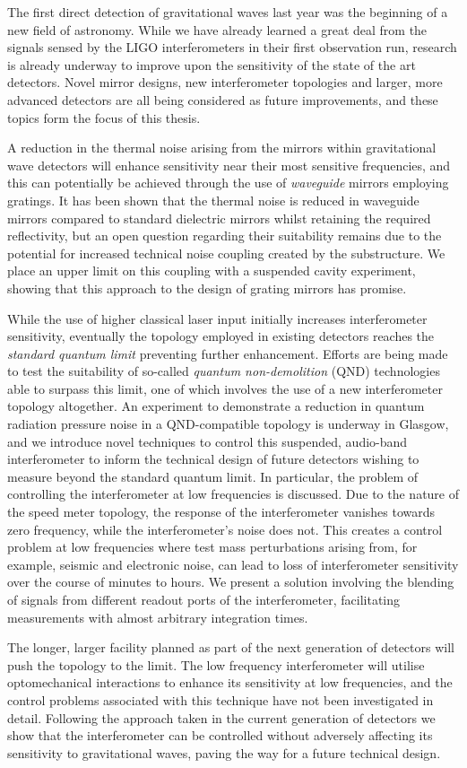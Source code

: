 The first direct detection of gravitational waves last year was the beginning 
of a new field of astronomy. While we have already learned a great deal from 
the signals sensed by the LIGO interferometers in their first observation run, 
research is already underway to improve upon the sensitivity of the state of the 
art detectors. Novel mirror designs, new interferometer topologies and larger, 
more advanced detectors are all being considered as future improvements, and 
these topics form the focus of this thesis.

A reduction in the thermal noise arising from the mirrors within gravitational 
wave detectors will enhance sensitivity near their most sensitive frequencies, 
and this can potentially be achieved through the use of \emph{waveguide} mirrors 
employing gratings. It has been shown that the thermal noise is reduced in 
waveguide mirrors compared to standard dielectric mirrors whilst retaining the 
required reflectivity, but an open question regarding their suitability remains 
due to the potential for increased technical noise coupling created by the 
substructure. We place an upper limit on this coupling with a suspended cavity 
experiment, showing that this approach to the design of grating mirrors has 
promise.

While the use of higher classical laser input initially increases 
interferometer sensitivity, eventually the \MI{} topology employed in existing 
detectors reaches the \emph{standard quantum limit} preventing further 
enhancement. Efforts are being made to test the suitability of so-called 
\emph{quantum non-demolition} (QND) technologies able to surpass this limit, one 
of which involves the use of a new interferometer topology altogether. An 
experiment to demonstrate a reduction in quantum radiation pressure noise in a 
QND-compatible \SSM{} topology is underway in Glasgow, and we introduce novel 
techniques to control this suspended, audio-band interferometer to inform the 
technical design of future detectors wishing to measure beyond the standard 
quantum limit. In particular, the problem of controlling the interferometer at 
low frequencies is discussed. Due to the nature of the speed meter topology, the 
response of the interferometer vanishes towards zero frequency, while the 
interferometer's noise does not. This creates a control problem at low 
frequencies where test mass perturbations arising from, for example, seismic and 
electronic noise, can lead to loss of interferometer sensitivity over the course 
of minutes to hours. We present a solution involving the blending of signals 
from different readout ports of the interferometer, facilitating measurements 
with almost arbitrary integration times.

The longer, larger \ET{} facility planned as part of the next generation of 
detectors will push the \MI{} topology to the limit. The low frequency 
interferometer will utilise optomechanical interactions to enhance its 
sensitivity at low frequencies, and the control problems associated with this 
technique have not been investigated in detail. Following the approach taken in 
the current generation of detectors we show that the interferometer can be 
controlled without adversely affecting its sensitivity to gravitational waves, 
paving the way for a future technical design.